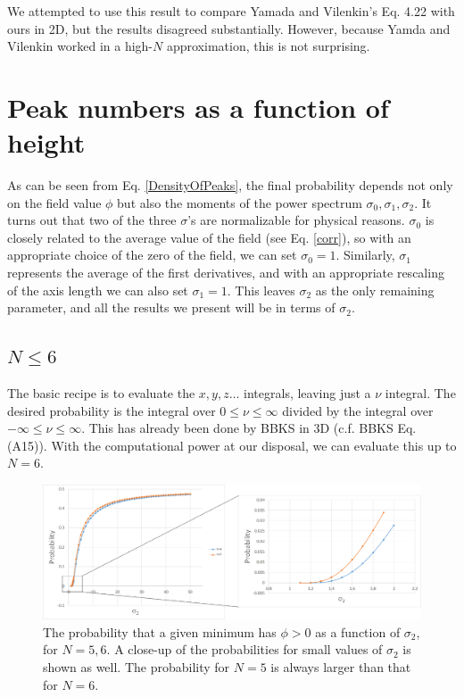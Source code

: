 \documentclass[12pt]{article}
\begin{document}
We attempted to use this result to compare Yamada and Vilenkin's Eq. 4.22 with ours in 2D, but the results disagreed substantially. However, because Yamda and Vilenkin worked in a high-$N$ approximation, this is not surprising.

\section{Peak numbers as a function of height} \label{PeakNumbers}

As can be seen from Eq. \ref{DensityOfPeaks}, the final probability depends not only on the field value $\phi$ but also the moments of the power spectrum $\sigma_0, \sigma_1, \sigma_2$. It turns out that two of the three $\sigma$'s are normalizable for physical reasons. $\sigma_0$ is closely related to the average value of the field (see Eq. \ref{corr}), so with an appropriate choice of the zero of the field, we can set $\sigma_0 = 1$. Similarly, $\sigma_1$ represents the average of the first derivatives, and with an appropriate rescaling of the axis length we can also set $\sigma_1 = 1$. This leaves $\sigma_2$ as the only remaining parameter, and all the results we present will be in terms of $\sigma_2$.

\subsection{$N \leq 6$}
The basic recipe is to evaluate the $x, y, z \ldots$ integrals, leaving just a $\nu$ integral. The desired probability is the integral over $0 \leq \nu \leq \infty$ divided by the integral over $-\infty \leq \nu \leq \infty$. This has already been done by BBKS in 3D (c.f. BBKS Eq. (A15)). With the computational power at our disposal, we can evaluate this up to $N=6$.

\begin{figure}
  \centering
  \includegraphics[width=\linewidth]{N6minima.png}
  \caption{The probability that a given minimum has $\phi > 0$ as a function of $\sigma_2$, for $N=5,6$. A close-up of the probabilities for small values of $\sigma_2$ is shown as well. The probability for $N=5$ is always larger than that for $N=6$.}
  \label{N6}
\end{figure}
\end{document}
